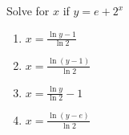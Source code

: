 \bigskip

\item Solve for $x$ if $y = e + 2^x$

\begin{enumerate}
\item $x = \frac{\ln y - 1}{\ln 2}$
\item $x = \frac{\ln (y - 1)}{\ln 2}$
\item $x = \frac{\ln y }{\ln 2} -1$
\item $x = \frac{\ln (y - e)}{\ln 2}$
\end{enumerate}

